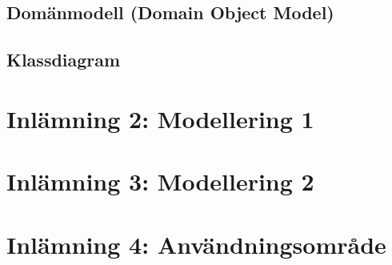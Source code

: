 \documentclass[a4paper,12pt]{article}
\begin{document}
\subsection{\textsf{Domänmodell (Domain Object Model)}}

\subsection{\textsf{Klassdiagram}}

\newpage
\section{\textsf{Inlämning 2: Modellering 1}}

\newpage
\section{\textsf{Inlämning 3: Modellering 2}}

\newpage
\section{\textsf{Inlämning 4: Användningsområde}}
\end{document}
